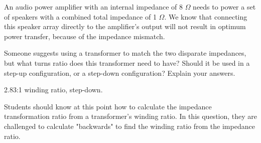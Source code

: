 

An audio power amplifier with an internal impedance of 8 $\Omega$ needs to power a set of speakers with a combined total impedance of 1 $\Omega$.  We know that connecting this speaker array directly to the amplifier's output will not result in optimum power transfer, because of the impedance mismatch.

Someone suggests using a transformer to match the two disparate impedances, but what turns ratio does this transformer need to have?  Should it be used in a step-up configuration, or a step-down configuration?  Explain your answers.







2.83:1 winding ratio, step-down.







Students should know at this point how to calculate the impedance transformation ratio from a transformer's winding ratio.  In this question, they are challenged to calculate "backwards" to find the winding ratio from the impedance ratio.




